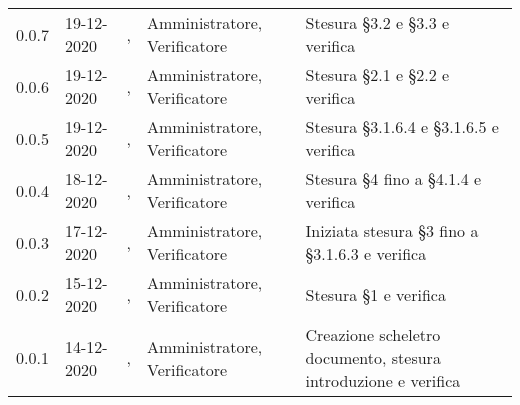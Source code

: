 {\begin{longtable}{C{1.7cm} | C{2.2cm} | C{3.2cm} | C{3cm} | C{4.8cm}}
0.0.7 & 19-12-2020 & \RA{}, \SP{} & Amministratore, Verificatore & Stesura \S 3.2 e \S 3.3 e verifica \\
0.0.6 & 19-12-2020 & \ZM{}, \BM{} & Amministratore, Verificatore & Stesura \S 2.1 e \S 2.2 e verifica \\
0.0.5 & 19-12-2020 & \PA{}, \SP{} & Amministratore, Verificatore & Stesura \S 3.1.6.4 e \S 3.1.6.5 e verifica \\
0.0.4 & 18-12-2020 & \SH{}, \SP{} & Amministratore, Verificatore & Stesura \S 4 fino a \S 4.1.4 e verifica\\
0.0.3 & 17-12-2020 & \PA{}, \BM{} & Amministratore, Verificatore & Iniziata stesura \S 3 fino a \S 3.1.6.3 e verifica\\
0.0.2 & 15-12-2020 & \PA{}, \SP{} & Amministratore, Verificatore & Stesura \S 1 e verifica\\
0.0.1 & 14-12-2020 & \ZM{}, \SP{} & Amministratore, Verificatore & Creazione scheletro documento, stesura introduzione e verifica\\
		
\end{longtable}
}
